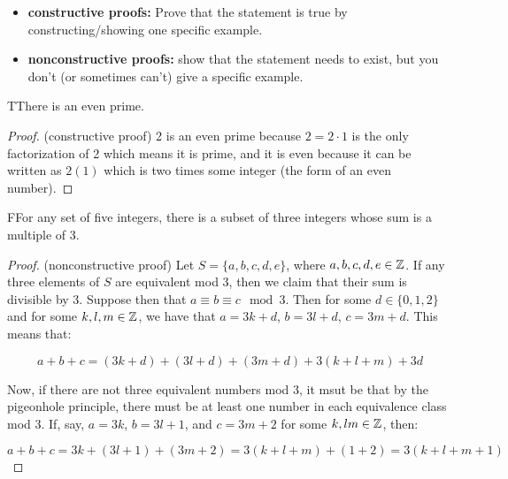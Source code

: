 \begin{itemize}
    \item \textbf{constructive proofs:} Prove that the statement is true by constructing/showing one specific example. 
    \item \textbf{nonconstructive proofs:} show that the statement needs to exist, but you don't (or sometimes can't) give a specific example.
\end{itemize}


\begin{proposition}
    TThere is an even prime.
\end{proposition}

\begin{proof}
    (constructive proof) 2 is an even prime because $2=2\cdot 1$ is the only factorization of 2 which means it is prime, and it is even because it can be written as $2(1)$ which is two times some integer (the form of an even number). 
\end{proof}


\begin{proposition}
    FFor any set of five integers, there is a subset of three integers whose sum is a multiple of 3. 
\end{proposition}

\begin{proof}
    (nonconstructive proof) Let $S = \{a,b,c,d,e\}$, where $a,b,c,d,e\in\mathbb{Z}$. If any three elements of $S$ are equivalent mod 3, then we claim that their sum is divisible by 3. Suppose then that $a\equiv b\equiv c \mod 3$. Then for some $d \in \{0,1,2\}$ and for some $k,l,m\in\mathbb{Z}$, we have that $a=3k+d$, $b=3l+d$, $c=3m+d$. This means that:

    \[
        a+b+c = (3k+d) + (3l+d) + (3m+d) + 3(k+l+m) + 3d  
    \]

    Now, if there are not three equivalent numbers mod 3, it msut be that by the pigeonhole principle, there must be at least one number in each equivalence class mod 3. If, say, $a=3k$, $b=3l+1$, and $c=3m+2$ for some $k,lm\in\mathbb{Z}$, then:

    \[
        a + b + c = 3k + (3l+1) + (3m+2) = 3(k+l+m) + (1+2) = 3(k+l+m+1)  
    \]
\end{proof}